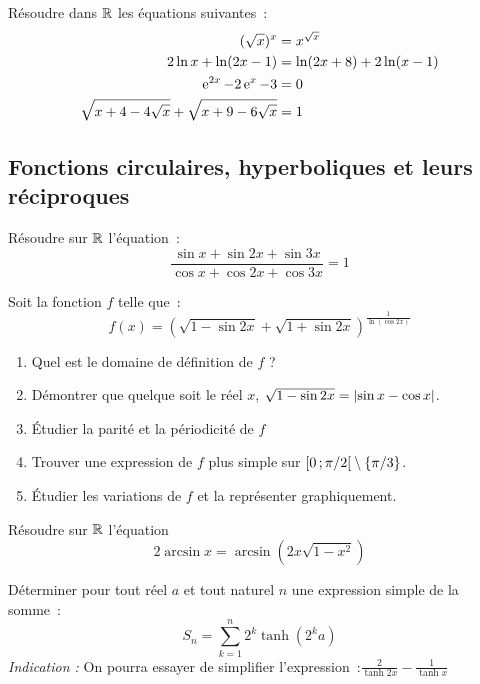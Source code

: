\begin{exercice}
    Résoudre dans \(\mathbb{R}\) les équations suivantes~:
    \begin{align}
        (\sqrt{x})^x &= x^{\sqrt{x}} \\
        2\ln x + \ln(2x-1) &= \ln(2x+8) + 2\ln(x-1) \\
        \operatorname{e}^{2x} -2\operatorname{e}^x-3 &=0 \\
        \sqrt{x+4-4\sqrt{x}} + \sqrt{x+9-6\sqrt{x}} &= 1
    \end{align}
\end{exercice}
\subsection{Fonctions circulaires, hyperboliques et leurs réciproques}
\begin{exercice}
    Résoudre sur \(\mathbb{R}\) l'équation~:
    \begin{equation}
        \frac{\sin x + \sin 2x + \sin 3x}{\cos x + \cos 2x + \cos 3x} = 1
    \end{equation}
\end{exercice}
\begin{exercice}
    Soit la fonction \(f\) telle que~:
    \begin{equation}
        f(x) = (\sqrt{1-\sin 2x}+\sqrt{1+\sin 2x})^{\frac{1}{\ln(\cos 2x)}}
    \end{equation}
    \begin{enumerate}
        \item Quel est le domaine de définition de \(f\) ?
        \item Démontrer que quelque soit le réel \(x\), \(\sqrt{1-\sin 
            2x}=\left\lvert\sin x - \cos x\right\rvert\).
        \item Étudier la parité et la périodicité de \(f\)
        \item Trouver une expression de \(f\) plus simple sur 
            \(\left[ 0 \, ;  \pi/2 \right[\setminus\{\pi/3\}\).
        \item Étudier les variations de \(f\) et la représenter graphiquement.
    \end{enumerate}
\end{exercice}
\begin{exercice}
    Résoudre sur \(\mathbb{R}\) l'équation
    \begin{equation}
        2\arcsin x = \arcsin(2x\sqrt{1-x^2})
    \end{equation}
\end{exercice}
\begin{exercice}
    Déterminer pour tout réel \(a\) et tout naturel \(n\) une expression simple 
    de la somme~:
    \begin{equation}
        S_n = \sum_{k=1}^n 2^k \tanh(2^k a)
    \end{equation}
    \emph{Indication :} On pourra essayer de simplifier 
    l'expression~:\(\frac{2}{\tanh 2x} - \frac{1}{\tanh x}\)
\end{exercice}
